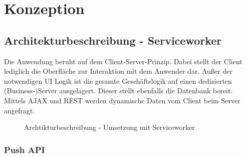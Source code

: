 \section{Konzeption}
\label{sec_konzeption}

\subsection{Architekturbeschreibung - Serviceworker}
\label{subsec_architekturbeschreibung}

Die Anwendung beruht auf dem Client-Server-Prinzip. Dabei stellt der Client lediglich die Oberfläche zur Interaktion mit dem Anwender dar. Außer der notwendigen UI Logik ist die gesamte Geschäftslogik auf einen dedizierten (Business-)Server ausgelagert. Dieser stellt ebenfalls die Datenbank bereit. Mittels AJAX und REST werden dynamische Daten vom Client beim Server angefragt.

\begin{figure}[htp] 
\caption{Archtikturbeschreibung - Umsetzung mit Serviceworker}
\label{image_architektur-serviceworker-push}
\end{figure} 

\subsubsection{Push API}

